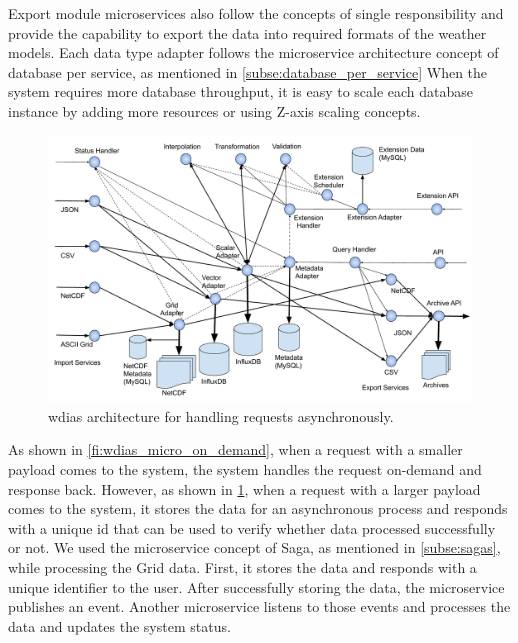 Export module microservices also follow the concepts of single responsibility and provide the capability to export the data into required formats of the weather models. Each data type adapter follows the microservice architecture concept of database per service, as mentioned in \cref{subse:database_per_service} When the system requires more database throughput, it is easy to scale each database instance by adding more resources or using Z-axis scaling concepts.

\begin{figure}[htp]
    \centering
    \includegraphics[width=1\textwidth]{method/microservice/microservice_architecture-handle_on_async-v4.pdf}
    \caption{\acrshort{wdias} architecture for handling requests asynchronously.}
    \label{fi:wdias_micro_async}
\end{figure}

As shown in \cref{fi:wdias_micro_on_demand}, when a request with a smaller payload comes to the system, the system handles the request on-demand and response back. However, as shown in \cref{fi:wdias_micro_async}, when a request with a larger payload comes to the system, it stores the data for an asynchronous process and responds with a unique id that can be used to verify whether data processed successfully or not. We used the microservice concept of Saga, as mentioned in \cref{subse:sagas}, while processing the Grid data. First, it stores the data and responds with a unique identifier to the user. After successfully storing the data, the microservice publishes an event. Another microservice listens to those events and processes the data and updates the system status.

